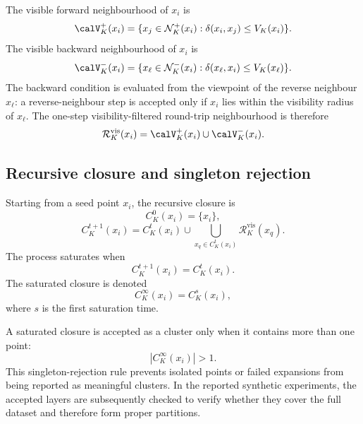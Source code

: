 \documentclass[pdflatex,sn-mathphys-num]{sn-jnl}
\newcommand{\calN}{\mathcal{N}}
\newcommand{\calR}{\mathcal{R}}
\begin{document}
The visible forward neighbourhood of $x_i$ is
\begin{equation}
\calV_K^+(x_i)=
\{x_j\in\calN_K^+(x_i):\delta(x_i,x_j)\leq V_K(x_i)\}.
\label{eq:visible_forward}
\end{equation}
The visible backward neighbourhood of $x_i$ is
\begin{equation}
\calV_K^-(x_i)=
\{x_\ell\in\calN_K^-(x_i):\delta(x_\ell,x_i)\leq V_K(x_\ell)\}.
\label{eq:visible_backward}
\end{equation}
The backward condition is evaluated from the viewpoint of the reverse neighbour $x_\ell$: a reverse-neighbour step is accepted only if $x_i$ lies within the visibility radius of $x_\ell$. The one-step visibility-filtered round-trip neighbourhood is therefore
\begin{equation}
\calR_K^{\mathrm{vis}}(x_i)=\calV_K^+(x_i)\cup\calV_K^-(x_i).
\label{eq:visible_roundtrip}
\end{equation}

\subsection{Recursive closure and singleton rejection}

Starting from a seed point $x_i$, the recursive closure is
\begin{equation}
C_K^0(x_i)=\{x_i\},
\end{equation}
\begin{equation}
C_K^{t+1}(x_i)=C_K^t(x_i)\cup
\bigcup_{x_q\in C_K^t(x_i)}\calR_K^{\mathrm{vis}}(x_q).
\label{eq:visibility_closure}
\end{equation}
The process saturates when
\begin{equation}
C_K^{t+1}(x_i)=C_K^t(x_i).
\end{equation}
The saturated closure is denoted
\begin{equation}
C_K^\infty(x_i)=C_K^s(x_i),
\end{equation}
where $s$ is the first saturation time.

A saturated closure is accepted as a cluster only when it contains more than one point:
\begin{equation}
|C_K^\infty(x_i)|>1.
\label{eq:singleton_rejection}
\end{equation}
This singleton-rejection rule prevents isolated points or failed expansions from being reported as meaningful clusters. In the reported synthetic experiments, the accepted layers are subsequently checked to verify whether they cover the full dataset and therefore form proper partitions.
\end{document}

